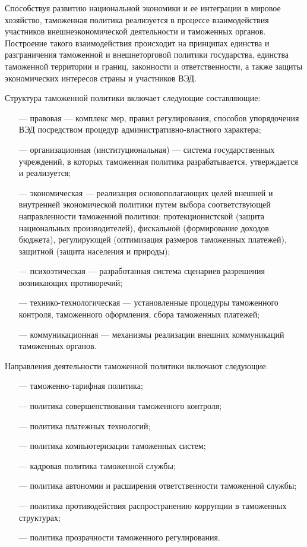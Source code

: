 Способствуя развитию национальной экономики и ее интеграции в мировое хозяйство, таможенная политика реализуется в процессе взаимодействия участников внешнеэкономической деятельности и таможенных органов. Построение такого взаимодействия происходит на принципах единства и разграничения таможенной и внешнеторговой политики государства, единства таможенной территории и границ, законности и ответственности, а также защиты экономических интересов страны и участников ВЭД.

Структура таможенной политики включает следующие составляющие:
\begin{enumerate}
	\item [---] правовая --- комплекс мер, правил регулирования, способов упорядочения ВЭД посредством процедур административно-властного характера;
	\item [---] организационная (институциональная) --- система государственных учреждений, в которых таможенная политика разрабатывается, утверждается и реализуется;
	\item [---] экономическая --- реализация основополагающих целей внешней и внутренней экономической политики путем выбора соответствующей  направленности таможенной политики: протекционистской (защита национальных производителей), фискальной (формирование доходов бюджета), регулирующей (оптимизация размеров таможенных платежей), защитной (защита населения и природы);
	\item [---] психоэтическая --- разработанная система сценариев разрешения возникающих противоречий;
	\item [---] технико-технологическая --- установленные процедуры таможенного контроля, таможенного оформления, сбора таможенных платежей;
	\item [---] коммуникационная --- механизмы реализации внешних коммуникаций таможенных органов.
\end{enumerate}

Направления деятельности таможенной политики включают следующие:
\begin{enumerate}
	\item [---] таможенно-тарифная политика;
	\item [---] политика совершенствования таможенного контроля;
	\item [---] политика платежных технологий;
	\item [---] политика компьютеризации таможенных систем;
	\item [---] кадровая политика таможенной службы;
	\item [---] политика автономии и расширения ответственности таможенной службы;
	\item [---] политика противодействия распространению коррупции в таможенных структурах;
	\item [---] политика прозрачности таможенного регулирования.
\end{enumerate}

